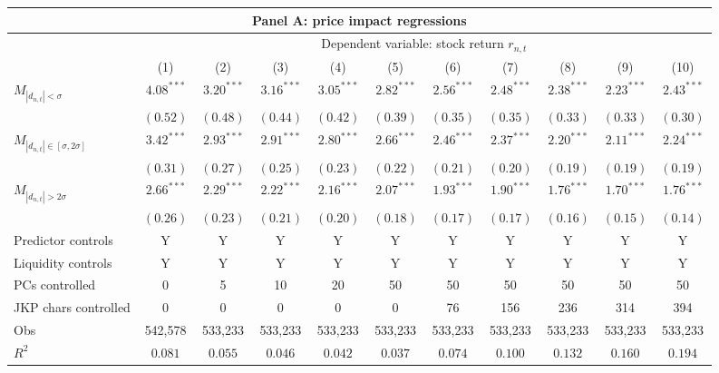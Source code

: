 \begin{tabular}{lcccccccccc}
  \hline \multicolumn{11}{c}{Panel A: price impact regressions} \\
 \hline
                                    & \multicolumn{10}{c}{Dependent variable: stock return $r_{n,t}$} \\

                                    \cmidrule(l){2-11}  
  & (1) & (2) & (3) & (4) & (5) & (6) & (7) & (8) & (9) & (10) \\ 
  $M_{|d_{n,t}| < \sigma}$ & $4.08^{***}$ & $3.20^{***}$ & $3.16^{***}$ & $3.05^{***}$ & $2.82^{***}$ & $2.56^{***}$ & $2.48^{***}$ & $2.38^{***}$ & $2.23^{***}$ & $2.43^{***}$ \\ 
   & $(0.52)$ & $(0.48)$ & $(0.44)$ & $(0.42)$ & $(0.39)$ & $(0.35)$ & $(0.35)$ & $(0.33)$ & $(0.33)$ & $(0.30)$ \\ 
  $M_{|d_{n,t}| \in [\sigma, 2\sigma]}$ & $3.42^{***}$ & $2.93^{***}$ & $2.91^{***}$ & $2.80^{***}$ & $2.66^{***}$ & $2.46^{***}$ & $2.37^{***}$ & $2.20^{***}$ & $2.11^{***}$ & $2.24^{***}$ \\ 
   & $(0.31)$ & $(0.27)$ & $(0.25)$ & $(0.23)$ & $(0.22)$ & $(0.21)$ & $(0.20)$ & $(0.19)$ & $(0.19)$ & $(0.19)$ \\ 
  $M_{|d_{n,t}| > 2 \sigma}$ & $2.66^{***}$ & $2.29^{***}$ & $2.22^{***}$ & $2.16^{***}$ & $2.07^{***}$ & $1.93^{***}$ & $1.90^{***}$ & $1.76^{***}$ & $1.70^{***}$ & $1.76^{***}$ \\ 
   & $(0.26)$ & $(0.23)$ & $(0.21)$ & $(0.20)$ & $(0.18)$ & $(0.17)$ & $(0.17)$ & $(0.16)$ & $(0.15)$ & $(0.14)$ \\ 
  Predictor controls & Y & Y & Y & Y & Y & Y & Y & Y & Y & Y \\ 
   \vspace{5pt}Liquidity controls & Y & Y & Y & Y & Y & Y & Y & Y & Y & Y \\ 
  PCs controlled & 0 & 5 & 10 & 20 & 50 & 50 & 50 & 50 & 50 & 50 \\ 
   \vspace{5pt}JKP chars controlled & 0 & 0 & 0 & 0 & 0 & 76 & 156 & 236 & 314 & 394 \\ 
  Obs & 542,578 & 533,233 & 533,233 & 533,233 & 533,233 & 533,233 & 533,233 & 533,233 & 533,233 & 533,233 \\ 
   \vspace{5pt}$R^2$ & $0.081$ & $0.055$ & $0.046$ & $0.042$ & $0.037$ & $0.074$ & $0.100$ & $0.132$ & $0.160$ & $0.194$ \\ 

\end{tabular}
